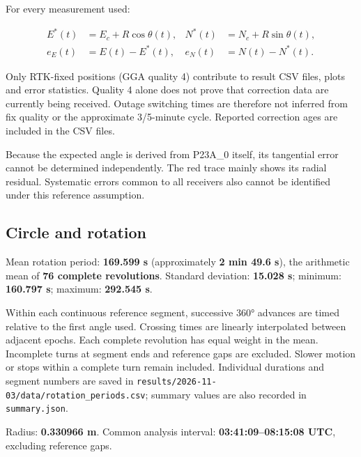 \documentclass[11pt,a4paper]{article}
\numberwithin{equation}{section}
\numberwithin{figure}{section}
\begin{document}
For every measurement used:

\begin{equation}\begin{aligned} E^*(t)&=E_c+R\cos\theta(t), & N^*(t)&=N_c+R\sin\theta(t),\\ e_E(t)&=E(t)-E^*(t), & e_N(t)&=N(t)-N^*(t).\end{aligned}\label{eq:en-circle}\end{equation}

Only RTK-fixed positions (GGA quality 4) contribute to result CSV files, plots and error statistics. Quality 4 alone does not prove that correction data are currently being received. Outage switching times are therefore not inferred from fix quality or the approximate 3/\allowbreak{}5-minute cycle. Reported correction ages are included in the CSV files.

Because the expected angle is derived from P23A\_0 itself, its tangential error cannot be determined independently. The red trace mainly shows its radial residual. Systematic errors common to all receivers also cannot be identified under this reference assumption.

\subsection{Circle and rotation}

Mean rotation period: \textbf{169.599 s} (approximately \textbf{2 min 49.6 s}), the arithmetic mean of \textbf{76 complete revolutions}. Standard deviation: \textbf{15.028 s}; minimum: \textbf{160.797 s}; maximum: \textbf{292.545 s}.

Within each continuous reference segment, successive 360° advances are timed relative to the first angle used. Crossing times are linearly interpolated between adjacent epochs. Each complete revolution has equal weight in the mean. Incomplete turns at segment ends and reference gaps are excluded. Slower motion or stops within a complete turn remain included. Individual durations and segment numbers are saved in {\small\texttt{results/\allowbreak{}2026-11-03/\allowbreak{}data/\allowbreak{}rotation\_\allowbreak{}periods.csv}}; summary values are also recorded in {\small\texttt{summary.json}}.

Radius: \textbf{0.330966 m}. Common analysis interval: \textbf{03:41:09–08:15:08 UTC}, excluding reference gaps.
\end{document}
